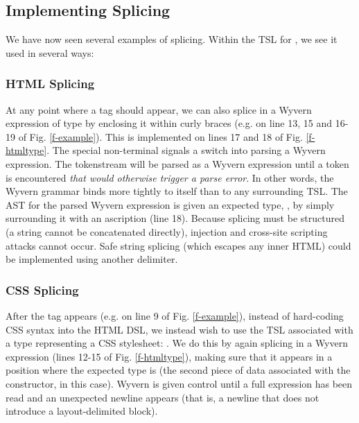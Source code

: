 %

\subsection{Implementing Splicing}\label{ss:implementing-interpolation}
We have now seen several examples of splicing. Within the TSL for , we see it used in several ways:

\subsubsection{HTML Splicing} At any point where a tag should appear, we can also splice in a Wyvern expression of type  by enclosing it within curly braces (e.g. on line 13, 15 and 16-19 of Fig. \ref{f-example}). This is implemented on lines 17 and 18 of Fig. \ref{f-htmltype}. The special non-terminal  signals a switch into parsing a Wyvern expression. The tokenstream will be parsed as a Wyvern expression until a  token is encountered \emph{that would otherwise trigger a parse error}. In other words, the Wyvern grammar binds more tightly to itself than to any surrounding TSL. The AST for the parsed Wyvern expression is given an expected type, , by simply surrounding it with an ascription (line 18). Because splicing must be structured (a string cannot be concatenated directly), injection and cross-site scripting attacks cannot occur. Safe string splicing (which escapes any inner HTML) could be implemented using another delimiter.

\subsubsection{CSS Splicing} After the  tag appears (e.g. on line 9 of Fig. \ref{f-example}), instead of hard-coding CSS syntax into the HTML DSL, we instead wish to use the TSL associated with a type representing a CSS stylesheet: . We do this by again splicing in a Wyvern expression (lines 12-15 of Fig. \ref{f-htmltype}), making sure that it appears in a position where the expected type is  (the second piece of data associated with the  constructor, in this case). Wyvern is given control until a full expression has been read and an unexpected newline appears (that is, a newline that does not introduce a layout-delimited block).

